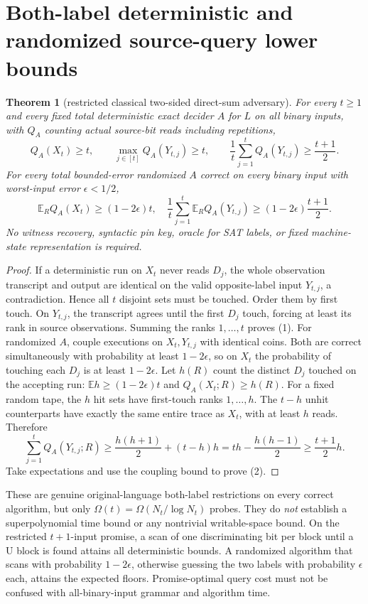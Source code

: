 \documentclass[11pt]{article}
\newtheorem{theorem}{Theorem}
\begin{document}
\section{Both-label deterministic and randomized source-query lower bounds}
\begin{theorem}[restricted classical two-sided direct-sum adversary]
For every $t\ge1$ and every \emph{fixed} total deterministic exact decider $A$ for $L$ on all binary inputs, with $Q_A$ counting actual source-bit reads including repetitions,
\[
Q_A(X_t)\ge t,\qquad \max_{j\in[t]}Q_A(Y_{t,j})\ge t,\qquad
\frac1t\sum_{j=1}^tQ_A(Y_{t,j})\ge\frac{t+1}{2}.
\tag{1}
\]
For every total bounded-error randomized $A$ correct on every binary input with worst-input error $\epsilon<1/2$,
\[
\mathbb E_R Q_A(X_t)\ge (1-2\epsilon)t,\quad
\frac1t\sum_{j=1}^t\mathbb E_R Q_A(Y_{t,j})\ge(1-2\epsilon)\frac{t+1}{2}.
\tag{2}
\]
No witness recovery, syntactic pin key, oracle for SAT labels, or fixed machine-state representation is required.
\end{theorem}
\begin{proof}
If a deterministic run on $X_t$ never reads $D_j$, the whole observation transcript and output are identical on the valid opposite-label input $Y_{t,j}$, a contradiction. Hence all $t$ disjoint sets must be touched. Order them by first touch. On $Y_{t,j}$, the transcript agrees until the first $D_j$ touch, forcing at least its rank in source observations. Summing the ranks $1,\ldots,t$ proves (1).
For randomized $A$, couple executions on $X_t,Y_{t,j}$ with identical coins. Both are correct simultaneously with probability at least $1-2\epsilon$, so on $X_t$ the probability of touching each $D_j$ is at least $1-2\epsilon$. Let $h(R)$ count the distinct $D_j$ touched on the accepting run: $\mathbb E h\ge(1-2\epsilon)t$ and $Q_A(X_t;R)\ge h(R)$. For a fixed random tape, the $h$ hit sets have first-touch ranks $1,\ldots,h$. The $t-h$ unhit counterparts have exactly the same entire trace as $X_t$, with at least $h$ reads. Therefore
\[
\sum_{j=1}^tQ_A(Y_{t,j};R)\ge
\frac{h(h+1)}2+(t-h)h
=th-\frac{h(h-1)}2\ge\frac{t+1}{2}h.
\]
Take expectations and use the coupling bound to prove (2).
\end{proof}
These are genuine original-language both-label restrictions on every correct algorithm, but only $\Omega(t)=\Omega(N_t/\log N_t)$ probes. They do \emph{not} establish a superpolynomial time bound or any nontrivial writable-space bound. On the restricted $t+1$-input promise, a scan of one discriminating bit per block until a U block is found attains all deterministic bounds. A randomized algorithm that scans with probability $1-2\epsilon$, otherwise guessing the two labels with probability $\epsilon$ each, attains the expected floors. Promise-optimal query cost must not be confused with all-binary-input grammar and algorithm time.
\end{document}

